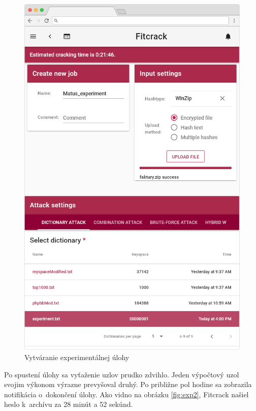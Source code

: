 \documentclass[slovak]{fitthesis}
\begin{document}
\begin{figure}[H]
    \centering
    \includegraphics[scale=0.4]{obrazky/exp1Frame.PNG}
    \caption{Vytváranie experimentálnej úlohy}
    \label{fig:exp1}
\end{figure}
Po spustení úlohy sa vyťaženie uzlov prudko zdvihlo. Jeden výpočtový uzol svojim výkonom výrazne prevyšoval druhý. Po približne pol hodine sa zobrazila notifikácia o~dokončení úlohy. Ako vidno na obrázku \ref{fig:exp2}, Fitcrack našiel heslo k~archívu za 28 minút a 52 sekúnd.
\end{document}
